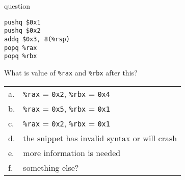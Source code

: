 \begin{frame}[fragile,label=asmQ]{question}
\begin{lstlisting}[language=myasm,style=small]
pushq $0x1
pushq $0x2
addq $0x3, 8(%rsp)
popq %rax
popq %rbx
\end{lstlisting}

What is value of {\tt \%rax} and {\tt \%rbx} after this?
\vspace{1ex}
\begin{tabular}{ll}
    a.& {\tt \%rax} = {\tt 0x2}, {\tt \%rbx} = {\tt 0x4} \\
    b.& {\tt \%rax} = {\tt 0x5}, {\tt \%rbx} = {\tt 0x1} \\
    c.& {\tt \%rax} = {\tt 0x2}, {\tt \%rbx} = {\tt 0x1} \\
    d.& the snippet has invalid syntax or will crash \\
    e.&  more information is needed \\
    f.& something else? \\
\end{tabular}
\end{frame}


